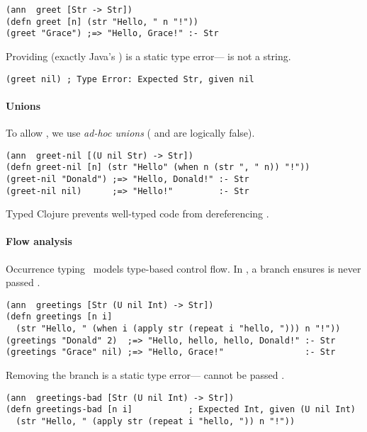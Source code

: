 \begin{lstlisting}
(ann  greet [Str -> Str])
(defn greet [n] (str "Hello, " n "!"))
(greet "Grace") ;=> "Hello, Grace!" :- Str
\end{lstlisting}
%
Providing  (exactly Java's )
is a static type error--- is not a string.
%
\begin{lstlisting}
(greet nil) ; Type Error: Expected Str, given nil
\end{lstlisting}

\paragraph{Unions} To allow , we use \emph{ad-hoc unions} ( and 
are logically false).
%
\begin{lstlisting}
(ann  greet-nil [(U nil Str) -> Str])
(defn greet-nil [n] (str "Hello" (when n (str ", " n)) "!"))
(greet-nil "Donald") ;=> "Hello, Donald!" :- Str 
(greet-nil nil)      ;=> "Hello!"         :- Str
\end{lstlisting}
%
%
Typed Clojure prevents well-typed code from dereferencing .

\paragraph{Flow analysis} Occurrence typing~\cite{TF10}
models type-based control flow.
In , a branch ensures 
is never passed .
%
\begin{lstlisting}
(ann  greetings [Str (U nil Int) -> Str])
(defn greetings [n i]
  (str "Hello, " (when i (apply str (repeat i "hello, "))) n "!"))
(greetings "Donald" 2)  ;=> "Hello, hello, hello, Donald!" :- Str
(greetings "Grace" nil) ;=> "Hello, Grace!"                :- Str
\end{lstlisting}
%
Removing the branch is a static type error--- cannot be passed .
%
\begin{lstlisting}
(ann  greetings-bad [Str (U nil Int) -> Str])
(defn greetings-bad [n i]           ; Expected Int, given (U nil Int)
  (str "Hello, " (apply str (repeat i "hello, ")) n "!"))
\end{lstlisting}


